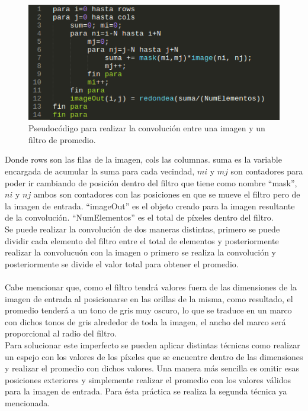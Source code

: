 \documentclass[conference]{IEEEtran}
\begin{document}
\begin{figure}[h]
	\begin{center}
		\setlength{\unitlength}{0.00105in}
		\includegraphics[scale=0.50]{./images/average.png}
	\end{center}
	\caption{Pseudoc\'odigo para realizar la convoluci\'on entre una imagen y un filtro de promedio.}
\end{figure}

Donde rows son las filas de la imagen, cols las columnas. suma es la variable encargada de acumular la suma para cada vecindad, $mi$ y $mj$ son contadores para poder ir cambiando de posici\'on dentro del filtro que tiene como nombre ``mask'', $ni$ y $nj$ ambos son contadores con las posiciones en que se mueve el filtro pero de la imagen de entrada. ``imageOut'' es el objeto creado para la imagen resultante de la convoluci\'on. ``NumElementos'' es el total de p\'ixeles dentro del filtro.\\
Se puede realizar la convoluci\'on de dos maneras distintas, primero se puede dividir cada elemento del filtro entre el total de elementos y posteriormente realizar la convolucu\'on con la imagen o primero se realiza la convoluci\'on y posteriormente se divide el valor total para obtener el promedio.\\\\ Cabe mencionar que, como el filtro tendr\'a valores fuera de las dimensiones de la imagen de entrada al posicionarse en las orillas de la misma, como resultado, el promedio tender\'a a un tono de gris muy oscuro, lo que se traduce en un marco con dichos tonos de gris alrededor de toda la imagen, el ancho del marco ser\'a proporcional al radio del filtro.\\
Para solucionar este imperfecto se pueden aplicar distintas t\'ecnicas como realizar un espejo con los valores de los p\'ixeles que se encuentre dentro de las dimensiones y realizar el promedio con dichos valores. Una manera m\'as sencilla es omitir esas posiciones exteriores y simplemente realizar el promedio con los valores v\'alidos para la imagen de entrada. Para \'esta pr\'actica se realiza la segunda t\'ecnica ya mencionada.\\\\
\end{document}
